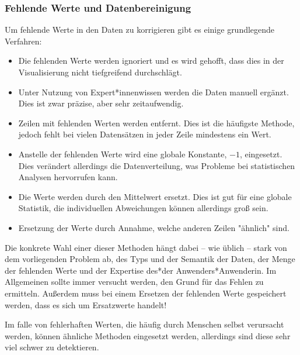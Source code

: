 		\subsubsection{Fehlende Werte und Datenbereinigung}
			Um fehlende Werte in den Daten zu korrigieren gibt es einige grundlegende Verfahren:
			\begin{itemize}
				\item {} Die fehlenden Werte werden ignoriert und es wird gehofft, dass dies in der Visualisierung nicht tiefgreifend durchschlägt.
				\item {} Unter Nutzung von Expert*innenwissen werden die Daten manuell ergänzt. Dies ist zwar präzise, aber sehr zeitaufwendig.
				\item {} Zeilen mit fehlenden Werten werden entfernt. Dies ist die häufigste Methode, jedoch fehlt bei vielen Datensätzen in jeder Zeile mindestens ein Wert.
				\item {} Anstelle der fehlenden Werte wird eine globale Konstante, \zB \(-1\), eingesetzt. Dies verändert allerdings die Datenverteilung, was Probleme bei statistischen Analysen hervorrufen kann.
				\item {} Die Werte werden durch den Mittelwert ersetzt. Dies ist gut für eine globale Statistik, die individuellen Abweichungen können allerdings groß sein.
				\item {} Ersetzung der Werte durch Annahme, welche anderen Zeilen "ähnlich" sind.
			\end{itemize}
			Die konkrete Wahl einer dieser Methoden hängt dabei -- wie üblich -- stark von dem vorliegenden Problem ab, \zB des Typs und der Semantik der Daten, der Menge der fehlenden Werte und der Expertise des*der Anwenders*Anwenderin. Im Allgemeinen sollte immer versucht werden, den Grund für das Fehlen zu ermitteln. Außerdem muss bei einem Ersetzen der fehlenden Werte gespeichert werden, dass es sich um Ersatzwerte handelt!

			Im falle von fehlerhaften Werten, die häufig durch Menschen selbst verursacht werden, können ähnliche Methoden eingesetzt werden, allerdings sind diese sehr viel schwer zu detektieren.

